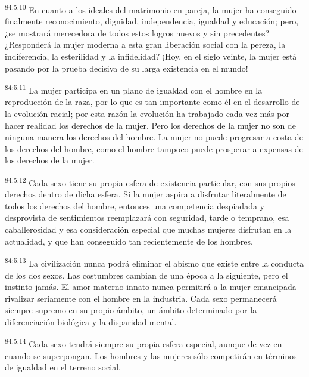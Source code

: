 \documentclass[twoside, 11pt]{book}
\begin{document}
\par
\textsuperscript{84:5.10} En cuanto a los ideales del matrimonio en pareja, la mujer ha conseguido finalmente reconocimiento, dignidad, independencia, igualdad y educación; pero, ¿se mostrará merecedora de todos estos logros nuevos y sin precedentes? ¿Responderá la mujer moderna a esta gran liberación social con la pereza, la indiferencia, la esterilidad y la infidelidad? ¡Hoy, en el siglo veinte, la mujer está pasando por la prueba decisiva de su larga existencia en el mundo!

\par
\textsuperscript{84:5.11} La mujer participa en un plano de igualdad con el hombre en la reproducción de la raza, por lo que es tan importante como él en el desarrollo de la evolución racial; por esta razón la evolución ha trabajado cada vez más por hacer realidad los derechos de la mujer. Pero los derechos de la mujer no son de ninguna manera los derechos del hombre. La mujer no puede progresar a costa de los derechos del hombre, como el hombre tampoco puede prosperar a expensas de los derechos de la mujer.

\par
\textsuperscript{84:5.12} Cada sexo tiene su propia esfera de existencia particular, con sus propios derechos dentro de dicha esfera. Si la mujer aspira a disfrutar literalmente de todos los derechos del hombre, entonces una competencia despiadada y desprovista de sentimientos reemplazará con seguridad, tarde o temprano, esa caballerosidad y esa consideración especial que muchas mujeres disfrutan en la actualidad, y que han conseguido tan recientemente de los hombres.

\par
\textsuperscript{84:5.13} La civilización nunca podrá eliminar el abismo que existe entre la conducta de los dos sexos. Las costumbres cambian de una época a la siguiente, pero el instinto jamás. El amor materno innato nunca permitirá a la mujer emancipada rivalizar seriamente con el hombre en la industria. Cada sexo permanecerá siempre supremo en su propio ámbito, un ámbito determinado por la diferenciación biológica y la disparidad mental.

\par
\textsuperscript{84:5.14} Cada sexo tendrá siempre su propia esfera especial, aunque de vez en cuando se superpongan. Los hombres y las mujeres sólo competirán en términos de igualdad en el terreno social.
\end{document}
